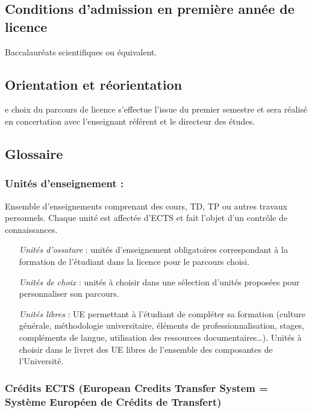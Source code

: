 \documentclass[10pt, a5paper]{report}
\begin{document}
\begin{spacing}{1.5}
\subsection*{Conditions d'admission en première année de licence}

Baccalauréats scientifiques ou équivalent.

\subsection*{Orientation et réorientation}

e choix du parcours de licence s'effectue l’issue du premier semestre et sera réalisé en concertation avec l'enseignant référent et le directeur des études.

\subsection*{Glossaire}

\subsubsection*{Unités d’enseignement :} 

Ensemble d’enseignements comprenant des cours, TD, TP ou autres travaux personnels. Chaque unité est affectée d’ECTS et fait l’objet d’un contrôle de connaissances.
\begin{itemize}
\item[\textit{Unités d’ossature}] : unités d’enseignement obligatoires correspondant à la formation de l’étudiant dans la licence  pour le parcours choisi.
\item[\textit{Unités de choix}] : unités à choisir dans une sélection d’unités proposées pour personnaliser son parcours.
\item[\textit{Unités libres}] : UE permettant à l’étudiant de compléter sa formation (culture générale, méthodologie universitaire, éléments de professionnalisation, stages, compléments de langue, utilisation des ressources documentaires…). Unités à choisir dans le livret des UE libres de l’ensemble des composantes de l’Université.
\end{itemize}

\subsubsection*{Crédits ECTS (European Credits Transfer System = Système Européen de Crédits de Transfert)}


\end{spacing}
\end{document}
